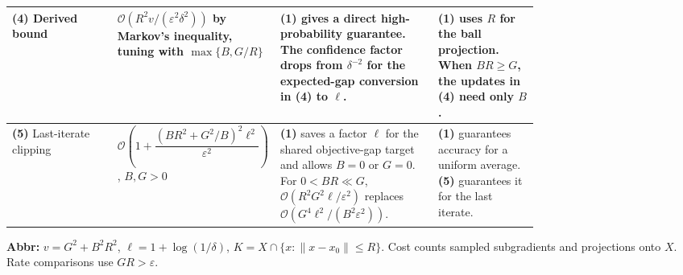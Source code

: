 \begin{table}[tp]
\begin{threeparttable}
\begin{tabularx}{\linewidth}{@{}>{\raggedright\arraybackslash}p{0.20\linewidth}>{\raggedright\arraybackslash}p{0.26\linewidth}>{\raggedright\arraybackslash}p{0.30\linewidth}>{\raggedright\arraybackslash}X@{}}
\midrule
\textbf{(4)} Derived bound \citep[Cor.~3.4]{tcAMW2026v3}
& \(\mathcal{O}(R^2 v/(\varepsilon^2\delta^2))\) by Markov's inequality, tuning with \(\max\{B,G/R\}\)
& \textbf{(1)} gives a direct high-probability guarantee. The confidence factor drops from \(\delta^{-2}\) for the expected-gap conversion in \textbf{(4)} to \(\ell\).
& \textbf{(1)} uses \(R\) for the ball projection. When \(BR\ge G\), the updates in \textbf{(4)} need only \(B\). \\
\midrule
\textbf{(5)} Last-iterate clipping \citep{dgsClippedBgRepository}
& \(\mathcal{O}\!\left(1+\dfrac{(BR^2+G^2/B)^2\ell^2}{\varepsilon^2}\right)\), \(B,G>0\)
& \textbf{(1)} saves a factor \(\ell\) for the shared objective-gap target and allows \(B=0\) or \(G=0\). For \(0<BR\ll G\), \(\mathcal{O}(R^2G^2\ell/\varepsilon^2)\) replaces \(\mathcal{O}(G^4\ell^2/(B^2\varepsilon^2))\).
& \textbf{(1)} guarantees accuracy for a uniform average. \textbf{(5)} guarantees it for the last iterate. \\
\bottomrule
\end{tabularx}
\begin{tablenotes}[flushleft]\footnotesize
\item[] \textbf{Abbr:} \(v=G^2+B^2R^2\), \(\ell=1+\log(1/\delta)\), \(K=X\cap\{x:\|x-x_0\|\le R\}\). Cost counts sampled subgradients and projections onto \(X\). Rate comparisons use \(GR>\varepsilon\).
\end{tablenotes}
\end{threeparttable}
\end{table}
